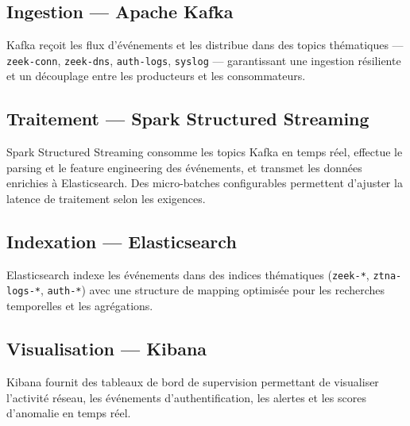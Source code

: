 \documentclass[12pt,a4paper,oneside]{report}
\begin{document}
	\subsection{Ingestion --- Apache Kafka}
	
	Kafka reçoit les flux d'événements et les distribue dans des topics thématiques
	--- \texttt{zeek-conn}, \texttt{zeek-dns}, \texttt{auth-logs}, \texttt{syslog}
	--- garantissant une ingestion résiliente et un découplage entre les producteurs
	et les consommateurs.
	
	\subsection{Traitement --- Spark Structured Streaming}
	
	Spark Structured Streaming consomme les topics Kafka en temps réel, effectue
	le parsing et le feature engineering des événements, et transmet les données
	enrichies à Elasticsearch. Des micro-batches configurables permettent d'ajuster
	la latence de traitement selon les exigences.
	
	\subsection{Indexation --- Elasticsearch}
	
	Elasticsearch indexe les événements dans des indices thématiques
	(\texttt{zeek-*}, \texttt{ztna-logs-*}, \texttt{auth-*}) avec une structure
	de mapping optimisée pour les recherches temporelles et les agrégations.
	
	\subsection{Visualisation --- Kibana}
	
	Kibana fournit des tableaux de bord de supervision permettant de visualiser
	l'activité réseau, les événements d'authentification, les alertes et les
	scores d'anomalie en temps réel.
	
\end{document}
